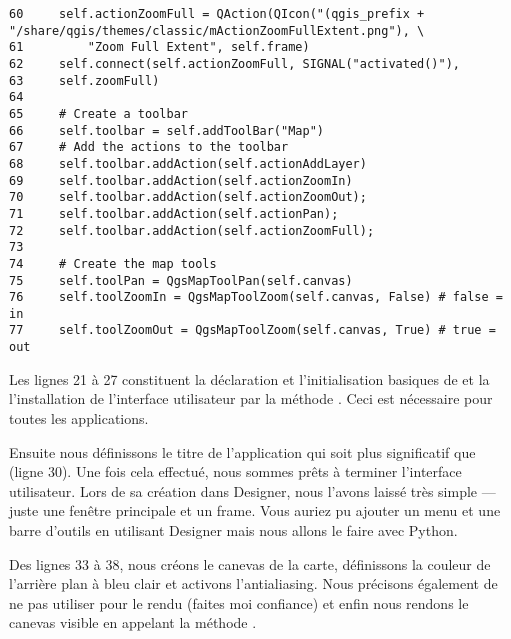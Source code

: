\begin{verbatim}
60     self.actionZoomFull = QAction(QIcon("(qgis_prefix + "/share/qgis/themes/classic/mActionZoomFullExtent.png"), \
61         "Zoom Full Extent", self.frame)
62     self.connect(self.actionZoomFull, SIGNAL("activated()"),
63     self.zoomFull)
64 
65     # Create a toolbar
66     self.toolbar = self.addToolBar("Map")
67     # Add the actions to the toolbar
68     self.toolbar.addAction(self.actionAddLayer)
69     self.toolbar.addAction(self.actionZoomIn)
70     self.toolbar.addAction(self.actionZoomOut);
71     self.toolbar.addAction(self.actionPan);
72     self.toolbar.addAction(self.actionZoomFull);
73 
74     # Create the map tools
75     self.toolPan = QgsMapToolPan(self.canvas)
76     self.toolZoomIn = QgsMapToolZoom(self.canvas, False) # false = in
77     self.toolZoomOut = QgsMapToolZoom(self.canvas, True) # true = out
\end{verbatim}

Les lignes 21 à 27 constituent la déclaration et l'initialisation basiques de \classname{MainWindow} et la l'installation de l'interface utilisateur par la méthode \method{setupUi}. Ceci est nécessaire pour toutes les applications.

Ensuite nous définissons le titre de l'application qui soit plus significatif que \usertext{MainWindow} (ligne 30). Une fois cela effectué, nous sommes prêts à terminer l'interface utilisateur. Lors de sa création dans Designer, nous l'avons laissé très simple --- juste une fenêtre principale et un frame. Vous auriez pu ajouter un menu et une barre d'outils en utilisant Designer mais nous allons le faire avec Python.

Des lignes 33 à 38, nous créons le canevas de la carte, définissons la couleur de l'arrière plan à bleu clair et activons l'antialiasing. Nous précisons également de ne pas utiliser \classname{QImage} pour le rendu (faites moi confiance) et enfin nous rendons le canevas visible en appelant la méthode \method{show}.

